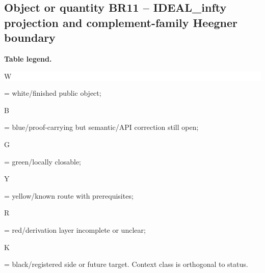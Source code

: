 \subsection*{Object or quantity BR11 -- IDEAL\_infty projection and complement-family Heegner boundary}
\hypertarget{objproof:BR11}{}
\par\smallskip\noindent\begin{minipage}{0.99\linewidth}\footnotesize\raggedright\textbf{Table legend.} \colorbox{white}{\strut W} = white/finished public object; \colorbox{cyan!20}{\strut B} = blue/proof-carrying but semantic/API correction still open; \colorbox{green!18}{\strut G} = green/locally closable; \colorbox{yellow!25}{\strut Y} = yellow/known route with prerequisites; \colorbox{red!20}{\strut R} = red/derivation layer incomplete or unclear; \colorbox{black!18}{\strut K} = black/registered side or future target. Context class is orthogonal to status.\end{minipage}\par\vspace{0.25em}
